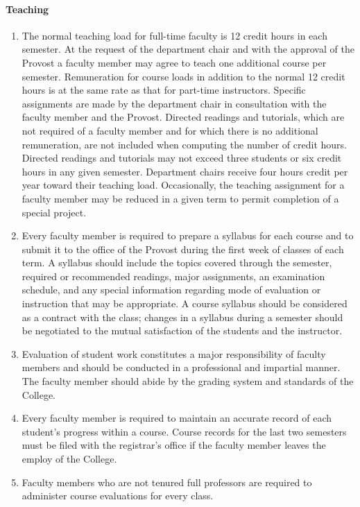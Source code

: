 \documentclass[letterpaper, 11pt]{article}
\begin{document}
			\paragraph{Teaching}
				\begin{enumerate}[label=\alph*)]
					\item{The normal teaching load for full-time faculty is 12 credit hours in each semester.  At the request of the department chair and with the approval of the Provost a faculty member may agree to teach one additional course per semester.  Remuneration for course loads in addition to the normal 12 credit hours is at the same rate as that for part-time instructors.  Specific assignments are made by the department chair in consultation with the faculty member and the Provost.  Directed readings and tutorials, which are not required of a faculty member and for which there is no additional remuneration, are not included when computing the number of credit hours.  Directed readings and tutorials may not exceed three students or six credit hours in any given semester.  Department chairs receive four hours credit per year toward their teaching load.  Occasionally, the teaching assignment for a faculty member may be reduced in a given term to permit completion of a special project.}
					\item{Every faculty member is required to prepare a syllabus for each course and to submit it to the office of the Provost during the first week of classes of each term.  A syllabus should include the topics covered through the semester, required or recommended readings, major assignments, an examination schedule, and any special information regarding mode of evaluation or instruction that may be appropriate.  A course syllabus should be considered as a contract with the class; changes in a syllabus during a semester should be negotiated to the mutual satisfaction of the students and the instructor.}
					\item{Evaluation of student work constitutes a major responsibility of faculty members and should be conducted in a professional and impartial manner.  The faculty member should abide by the grading system and standards of the College.}
					\item{Every faculty member is required to maintain an accurate record of each student's progress within a course.  Course records for the last two semesters must be filed with the registrar's office if the faculty member leaves the employ of the College.}
					\item{Faculty members who are not tenured full professors are required to administer course evaluations for every class.}
				\end{enumerate}
\end{document}
